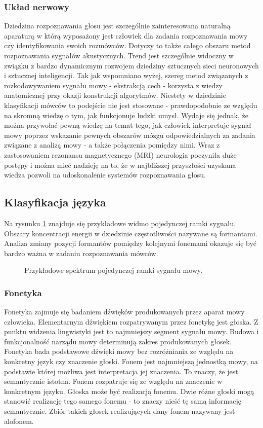 \subsubsection{Układ nerwowy}

Dziedzina rozpoznawania głosu jest szczególnie zainteresowana naturalną aparaturą w którą wyposażony jest człowiek dla zadania rozpoznawania mowy czy identyfikowania swoich rozmówców. Dotyczy to także całego obszaru metod rozpoznawania sygnałów akustycznych. Trend jest szczególnie widoczny w związku z bardzo dynamicznym rozwojem dziedziny sztucznych sieci neuronowych i sztucznej inteligencji. Tak jak wspomniano wyżej, szereg metod związanych z rozkodowywaniem sygnału mowy - ekstrakcją cech - korzysta z wiedzy anatomicznej przy okazji konstrukcji algorytmów. Niestety w dziedzinie klasyfikacji mówców to podejście nie jest stosowane - prawdopodobnie ze względu na skromną wiedzę o tym, jak funkcjonuje ludzki umysł. Wydaje się jednak, że można przywołać pewną wiedzę na temat tego, jak człowiek interpretuje sygnał mowy poprzez wskazanie pewnych obszarów mózgu odpowiedzialnych za zadania związane z analizą mowy - a także połączenia pomiędzy nimi. Wraz z zastosowaniem rezonansu magnetycznego (MRI) neurologia poczyniła duże postępy i można mieć nadzieję na to, że w najbliższej przyszłości uzyskana wiedza pozwoli na udoskonalenie systemów rozpoznawania głosu.

\subsection{Klasyfikacja języka}
\label{formant}
Na rysunku \ref{fig:spectrum} znajduje się przykładowe widmo pojedynczej ramki sygnału. Obszary koncentracji energii w dziedzinie częstotliwości nazywane są formantami. Analiza zmiany pozycji formantów pomiędzy kolejnymi fonemami okazuje się być bardzo ważna w zadaniu rozpoznawania mówców. 

\begin{figure}[ht!]
  \centering
    
    \caption{\label{fig:spectrum} Przykładowe spektrum pojedynczej ramki sygnału mowy.}
\end{figure}

\subsubsection{Fonetyka}
Fonetyka zajmuje się badaniem dźwięków produkowanych przez aparat mowy człowieka. Elementarnym dźwiękiem rozpatrywanym przez fonetykę jest głoska. Z punktu widzenia lingwistyki jest to najmniejszy segment sygnału mowy. Budowa i funkcjonalność narządu mowy determinują zakres produkowanych głosek. Fonetyka bada podstawowe dźwięki mowy bez rozróżniania ze względu na konkretny język czy znaczenie głoski.
Fonem jest najmniejszą jednostką mowy, na podstawie której możliwa jest interpretacja jej znaczenia. To znaczy, że jest semantycznie istotna. Fonem rozpatruje się ze względu na znaczenie w konkretnym języku. Głoska może być realizacją fonemu. Dwie różne głoski mogą stanowić realizację tego samego fonemu - to znaczy nieść tę samą informację semantycznie. Zbiór takich głosek realizujących dany fonem nazywany jest alofonem.

